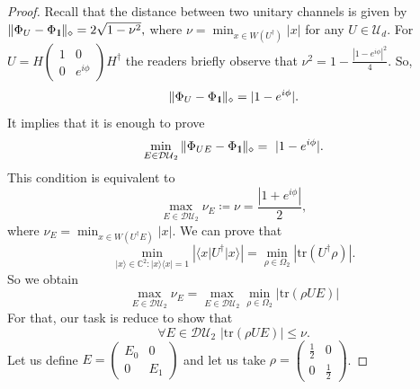 \documentclass[preprint,12pt, a4paper]{elsarticle}
\newcommand{\ket}[1]{\ensuremath{|#1\rangle}}
\newcommand{\bra}[1]{\ensuremath{\langle#1|}}
\newcommand{\ketbra}[2]{\ensuremath{\ket{#1}\bra{#2}}}
\newcommand{\proj}[1]{\ensuremath{\ketbra{#1}{#1}}}
\newcommand{\1}{{\rm 1\hspace{-0.9mm}l}}
\newcommand{\Id}{{\rm 1\hspace{-0.9mm}l}}
\newcommand{\diaguni}{\ensuremath{\mathcal{DU}}}
\newcommand{\tr}{\mathrm{tr}}
\begin{document}
\begin{proof} Recall that the distance between two unitary channels is given by
	$
	\| \Phi_U  - \Phi_{\1} \|_\diamond = 2 \sqrt{1-\nu^2},
	$
	where $\nu = \min_{x \in W(U^\dagger)} |x|  $ for any $U \in \mathcal{U}_d$. 
	For $U = H 
	\left(\begin{array}{cc}1&0\\0&e^{i \phi}\end{array}\right)  H^\dagger$ the readers briefly observe that  $\nu^2 = 1 - \frac{|1 - e^{i \phi} |^2 }{4}$. So, 
	\begin{equation}
	\|  \Phi_U  - \Phi_{\1} \|_\diamond = | 1 - e^{i \phi} |. 
	\end{equation} 
		It implies that it is enough to prove  \begin{equation}
		\min_{E \in \diaguni_2} \|\Phi_{UE} - 
		\Phi_\Id\|_\diamond  = | 1 - e^{i \phi} |.
		\end{equation}
This condition is equivalent to 
	\begin{equation}
	\max_{E \in \diaguni_2 } \nu_{E} \coloneqq \nu = \frac{|1 + e^{i \phi} | }{2},
	\end{equation}
	where $\nu_E = \min_{x \in W(U^\dagger E)} |x|. $ 
	We can prove that
	\begin{equation}
	\min_{\ket{x} \in \mathbb{C}^2:   \proj{x} = 1} |\bra{x}U^\dagger\ket{x}| = 
	\min_{\rho \in \Omega_2} |\tr(U^\dagger\rho)|. 
	\end{equation}
	So we obtain \begin{equation}
	\max_{E \in \diaguni_2 } \nu_{E}  = \max_{E \in \diaguni_2 }  \min_{\rho \in 
		\Omega_2} \left| \tr \left( \rho U E \right) \right|
	\end{equation}
	For that, our task is reduce to show that
	\begin{equation}
	\forall E \in \diaguni_2 \,\, | \tr \left(\rho U E\right) | \le \nu. 
	\end{equation}
	Let us define $E = \left(\begin{array}{cc}E_0&0\\0&E_1\end{array}\right)  $ 
	and let us take $\rho = 
	\left(\begin{array}{cc}\frac{1}{2}&0\\0&\frac{1}{2}\end{array}\right) $. 

\end{proof}
\end{document}
